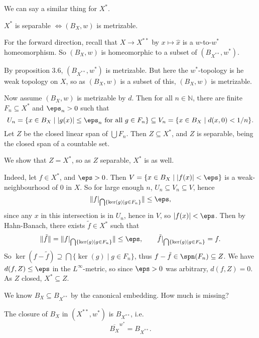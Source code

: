 \documentclass[12pt]{article}
\begin{document}
We can say a similar thing for $X^{\ast}$.

\begin{proposition}
	$X^{\ast}$ is separable $\iff (B_X, w)$ is metrizable.
\end{proposition}

\begin{proofbox}
	For the forward direction, recall that $X \to X^{\ast\ast}$ by $x \mapsto \hat x$ is a $w$-to-$w^{\ast}$ homeomorphism. So $(B_X, w)$ is homeomorphic to a subset of $(B_{X^{\ast\ast}}, w^{\ast})$.

	By proposition 3.6, $(B_{X^{\ast\ast}}, w^{\ast})$ is metrizable. But here the $w^{\ast}$-topology is he weak topology on $X$, so as $(B_X, w)$ is a subset of this, $(B_X, w)$ is metrizable.

	Now assume $(B_X, w)$ is metrizable by $d$. Then for all $n \in \mathbb{N}$, there are finite $F_n \subseteq X^{\ast}$ and $\eps_n> 0$ such that
	\[
		U_n = \{x \in B_X \mid |g(x)| \leq \eps_n \text{ for all }g \in F_n\} \subseteq V_n = \{x \in B_X \mid d(x, 0) < 1/n\}.
	\]
	Let $Z$ be the closed linear span of $\bigcup F_n$. Then $Z \subseteq X^{\ast}$, and $Z$ is separable, being the closed span of a countable set.

	We show that $Z = X^{\ast}$, so as $Z$ separable, $X^{\ast}$ is as well.

	Indeed, let $f \in X^{\ast}$, and $\eps > 0$. Then $V = \{x \in B_X \mid |f(x)| < \eps\}$ is a weak-neighbourhood of $0$ in $X$. So for large enough $n$, $U_n \subseteq V_n \subseteq V$, hence
	\[
		\| f|_{\bigcap \{ \ker (g) \mid g \in F_n \}}\| \leq \eps,
	\]
	since any $x$ in this intersection is in $U_n$, hence in $V$, so $|f(x)| < \eps$. Then by Hahn-Banach, there exists $\tilde f \in X^{\ast}$ such that
	\[
		\|\tilde f\| = \| f|_{\bigcap\{ \ker(g) \mid g \in F_n\}}\| \leq \eps, \qquad \tilde f|_{\bigcap\{\ker(g) \mid g \in F_n\}} = f.
	\]
	So $\ker(f - \tilde f) \supseteq \bigcap \{\ker (g) \mid g \in F_n\}$, thus $f - \tilde f \in \spn (F_n) \subseteq Z$. We have $d(f, Z) \leq \eps$ in the $L^\infty$-metric, so since $\eps > 0$ was arbitrary, $d(f, Z) = 0$. As $Z$ closed, $X^{\ast} \subseteq Z$.
\end{proofbox}

We know $B_X \subseteq B_{X^{\ast\ast}}$ by the canonical embedding. How much is missing?

\begin{theorem}
	The closure of $B_X$ in $(X^{\ast\ast}, w^{\ast})$ is $B_{X^{\ast\ast}}$, i.e.
	\[
	\overline{B_{X}}^{w^{\ast}} = B_{X^{\ast\ast}}.
	\]
\end{theorem}
\end{document}
